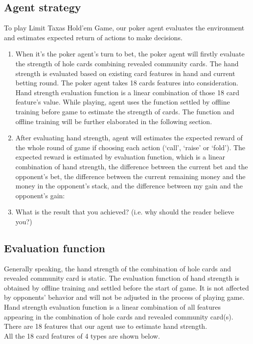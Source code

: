 \documentclass{article}
\begin{document}
\subsection{Agent strategy}
To play Limit Taxas Hold'em Game, our poker agent evaluates the environment and estimates expected return of actions to make decisions. 
\begin{enumerate}
	\item When it’s the poker agent’s turn to bet, the poker agent will firstly evaluate the strength of hole cards combining revealed community cards. The hand strength is evaluated based on existing card features in hand and current betting round. The poker agent takes 18 cards features into consideration. Hand strength evaluation function is a linear combination of those 18 card feature’s value. While playing, agent uses the function settled by offline training before game to estimate the strength of cards. The function and offline training will be further elaborated in the following section. 
	\item After evaluating hand strength, agent will estimates the expected reward of the whole round of game if choosing each action (‘call’, ‘raise’ or ‘fold’). The expected reward is estimated by evaluation function, which is a linear combination of hand strength, the difference between the current bet and the opponent’s bet, the difference between the current remaining money and the money in the opponent’s stack, and the difference between my gain and the opponent’s gain:
	
	\item What is the result that you achieved? (i.e. why should the reader believe you?)
\end{enumerate}

\subsection{Evaluation function}
Generally speaking, the hand strength of the combination of hole cards and revealed community card is static. The evaluation function of hand strength is obtained by offline training and settled before the start of game. It is not affected by opponents’  behavior and will not be adjusted in the process of playing game.                       
Hand strength evaluation function is a linear combination of all features appearing in the combination of hole cards and revealed community card(s). There are 18 features that our agent use to estimate hand strength. 
\\All the 18 card features of 4 types are shown below.
\end{document}

